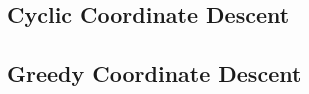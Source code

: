 \documentclass[11pt,a4paper]{article}
\begin{document}
\newpage
\subsection{Cyclic Coordinate Descent}
%

\newpage
\subsection{Greedy Coordinate Descent}
%
\end{document}
